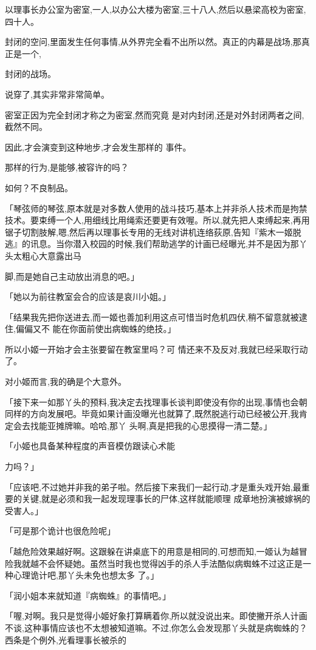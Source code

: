 \documentclass{article}
\begin{document}
以理事长办公室为密室,一人,以办公大楼为密室,三十八人,然后以悬梁高校为密室,四十人。

封闭的空问,里面发生任何事情,从外界完全看不出所以然。真正的内幕是战场,那真正是一个,
\newpage

封闭的战场。 


说穿了,其实非常非常简单。 

密室正因为完全封闭才称之为密室,然而究竟
是对内封闭,还是对外封闭两者之间,截然不同。 

因此,才会演变到这种地步,才会发生那样的
事件。 


那样的行为,是能够,被容许的吗？ 


如何？不良制品。 

「琴弦师的琴弦,原本就是对多数人使用的战斗技巧,基本上并非杀人技术而是拘禁技术。要束缚一个人,用细线比用绳索还要更有效喔。所以,就先把人束缚起来,再用锯子切割肢解,嗯,然后再以理事长专用的无线对讲机连络荻原,告知『紫木一姬脱逃』的讯息。当你潜入校园的时候,我们帮助逃学的计画已经曝光,并不是因为那丫头太粗心大意露出马
\newpage

脚,而是她自己主动放出消息的吧。」 

「她以为前往教室会合的应该是哀川小姐。」

「结果我先把你送进去,而一姬也善加利用这点可惜当时危机四伏,稍不留意就被逮住,偏偏又不
能在你面前使出病蜘蛛的绝技。」 

所以小姬一开始才会主张要留在教室里吗？可
情还来不及反对,我就已经采取行动了。 


对小姬而言,我的确是个大意外。 

「接下来一如那丫头的预料,我决定去找理事长谈判即使没有你的出现,事情也会朝同样的方向发展吧。毕竟如果计画没曝光也就算了,既然脱逃行动已经被公开,我肯定会去找能亚摊牌嘛。哈哈,那丫
头啊,真是把我的心思摸得一清二楚。」 

「小姬也具备某种程度的声音模仿跟读心术能

\newpage
力吗？」 

「应该吧,不过她并非我的弟子啦。然后接下来我们一起行动,才是重头戏开始,最重要的关键,就是必须和我一起发现理事长的尸体,这样就能顺理
成章地扮演被嫁祸的受害人。」 


「可是那个诡计也很危险呢」 

「越危险效果越好啊。这跟躲在讲桌底下的用意是相同的,可想而知,一姬认为越冒险我就越不会怀疑她。虽然当时我也觉得凶手的杀人手法酷似病蜘蛛不过这正是一种心理诡计吧,那丫头未免也想太多
了。」 

「润小姐本来就知道『病蜘蛛』的事情吧。」

「喔,对啊。我只是觉得小姬好象打算瞒着你,所以就没说出来。即使撇开杀人计画不谈,这种事情应该也不太想被知道嘛。不过,你怎么会发现那丫头就是病蜘蛛的？西条是个例外,光看理事长被杀的
\end{document}
